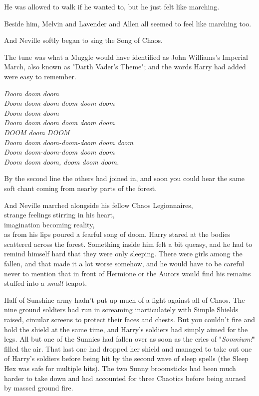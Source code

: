 He was allowed to walk if he wanted to, but he just felt like marching.

Beside him, Melvin and Lavender and Allen all seemed to feel like marching too.

And Neville softly began to sing the Song of Chaos.

The tune was what a Muggle would have identified as John Williams's Imperial March, also known as "Darth Vader's Theme"; and the words Harry had added were easy to remember.

\emph{Doom doom doom\\
Doom doom doom doom doom doom\\
Doom doom doom\\
Doom doom doom doom doom doom\\
DOOM doom DOOM\\
Doom doom doom-doom-doom doom doom\\
Doom doom-doom-doom doom doom\\
Doom doom doom, doom doom doom.}

By the second line the others had joined in, and soon you could hear the same soft chant coming from nearby parts of the forest.

And Neville marched alongside his fellow Chaos Legionnaires,\\
strange feelings stirring in his heart,\\
imagination becoming reality,\\
as from his lips poured a fearful song of doom.
\sbreak
Harry stared at the bodies scattered across the forest. Something inside him felt a bit queasy, and he had to remind himself hard that they were only sleeping. There were girls among the fallen, and that made it a lot worse somehow, and he would have to be careful never to mention that in front of Hermione or the Aurors would find his remains stuffed into a \emph{small} teapot.

Half of Sunshine army hadn't put up much of a fight against all of Chaos. The nine ground soldiers had run in screaming inarticulately with Simple Shields raised, circular screens to protect their faces and chests. But you couldn't fire and hold the shield at the same time, and Harry's soldiers had simply aimed for the legs. All but one of the Sunnies had fallen over as soon as the cries of "\emph{Somnium!}" filled the air. That last one had dropped her shield and managed to take out one of Harry's soldiers before being hit by the second wave of sleep spells (the Sleep Hex was safe for multiple hits). The two Sunny broomsticks had been much harder to take down and had accounted for three Chaotics before being auraed by massed ground fire.


